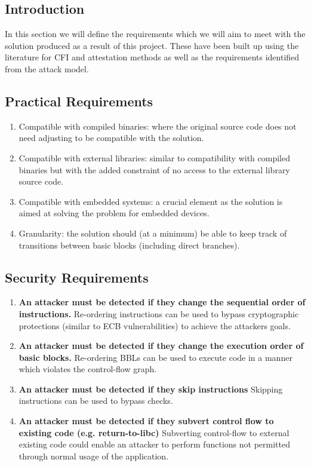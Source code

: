 \subsection{Introduction}\label{projectRequirements}

In this section we will define the requirements which we will aim to meet with the solution produced as a result of this project. These have been built up using the literature for CFI and attestation methods as well as the requirements identified from the attack model.

\subsection{Practical Requirements}

\begin{enumerate}
	\item Compatible with compiled binaries: where the original source code does not need adjusting to be compatible with the solution.
	\item Compatible with external libraries: similar to compatibility with compiled binaries but with the added constraint of no access to the external library source code. 
	\item Compatible with embedded systems: a crucial element as the solution is aimed at solving the problem for embedded devices.
	\item Granularity: the solution should (at a minimum) be able to keep track of transitions between basic blocks (including direct branches).
\end{enumerate}

\subsection{Security Requirements}
 
\begin{enumerate}
	\item \textbf{An attacker must be detected if they change the sequential order of instructions.} Re-ordering instructions can be used to bypass cryptographic protections (similar to ECB vulnerabilities) to achieve the attackers goals.
	\item \textbf{An attacker must be detected if they change the execution order of basic blocks.} Re-ordering BBLs can be used to execute code in a manner which violates the control-flow graph.
	\item \textbf{An attacker must be detected if they skip instructions} Skipping instructions can be used to bypass checks.
	\item \textbf{An attacker must be detected if they subvert control flow to existing code (e.g. return-to-libc)} Subverting control-flow to external existing code could enable an attacker to perform functions not permitted through normal usage of the application.
\end{enumerate}

